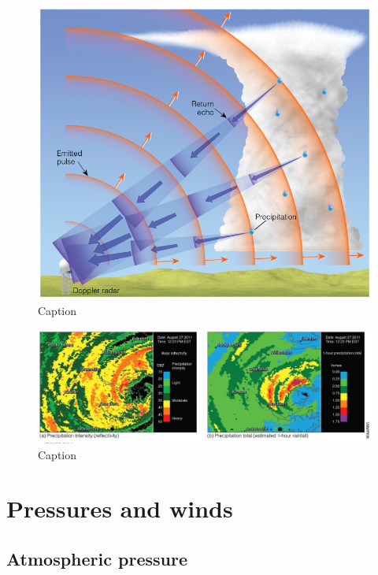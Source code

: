\documentclass[12pt,oneside]{book}
\begin{document}
\begin{figure}

{\centering \includegraphics[width=0.9\linewidth]{figures/Figure351} 

}

\caption{Caption}\label{fig:Precipmeas3}
\end{figure}

\begin{figure}

{\centering \includegraphics[width=0.9\linewidth]{figures/Figure352} 

}

\caption{Caption}\label{fig:Precipmeas4}
\end{figure}

\chapter{Pressures and winds}\label{pressures-and-winds}


\section{Atmospheric pressure}\label{atmospheric-pressure}
\end{document}
